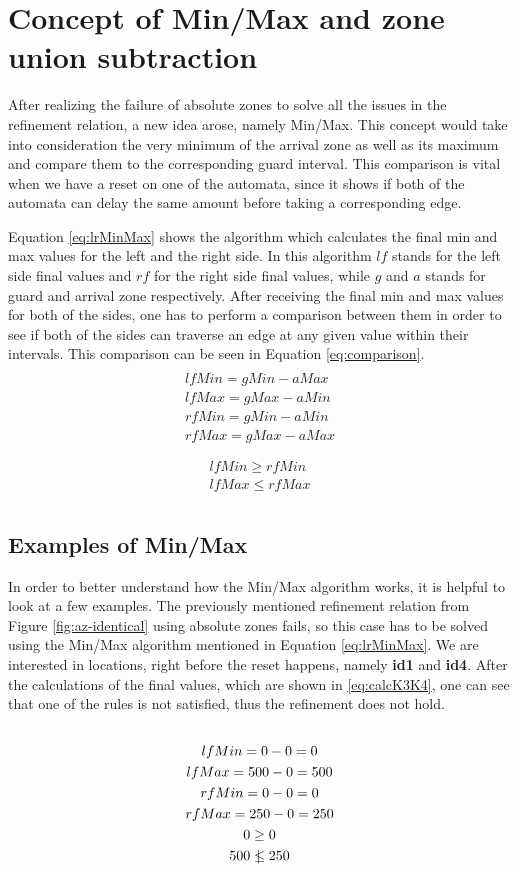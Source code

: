 \section{Concept of Min/Max and zone union subtraction}
After realizing the failure of absolute zones to solve all the issues in the refinement relation, a new idea arose, namely Min/Max. This concept would take into consideration the very minimum of the arrival zone as well as its maximum and compare them to the corresponding guard interval. This comparison is vital when we have a reset on one of the automata, since it shows if both of the automata can delay the same amount before taking a corresponding edge.

Equation \ref{eq:lrMinMax} shows the algorithm which calculates the final min and max values for the left and the right side. In this algorithm $lf$ stands for the left side final values and $rf$ for the right side final values, while $g$ and $a$ stands for guard and arrival zone respectively. After receiving the final min and max values for both of the sides, one has to perform a comparison between them in order to see if both of the sides can traverse an edge at any given value within their intervals. This comparison can be seen in Equation \ref{eq:comparison}.
\begin{multline}
\label{eq:lrMinMax}
\\
lfMin = gMin - aMax\\
lfMax = gMax - aMin\\
rfMin = gMin - aMin\\
rfMax = gMax - aMax\\
\end{multline}
\begin{multline}
\label{eq:comparison}
\\
lfMin \geq rfMin\\
lfMax \leq rfMax\\
\end{multline}
\subsection{Examples of Min/Max}
In order to better understand how the Min/Max algorithm works, it is helpful to look at a few examples. The previously mentioned refinement relation from Figure \ref{fig:az-identical} using absolute zones fails, so this case has to be solved using the Min/Max algorithm mentioned in Equation \ref{eq:lrMinMax}. We are interested in locations, right before the reset happens, namely \textbf{id1} and \textbf{id4}. After the calculations of the final values, which are shown in \ref{eq:calcK3K4}, one can see that one of the rules is not satisfied, thus the refinement does not hold.
\begin{multline}
\label{eq:calcK3K4}
\\
lfMin = 0 - 0 = 0\\
lfMax = 500 - 0 = 500\\
rfMin = 0 - 0 = 0\\
rfMax = 250 - 0 = 250\\
0 \geq 0 \\
500 \rlap{\kern.45em$|$}\leq 250 \\
\end{multline}

